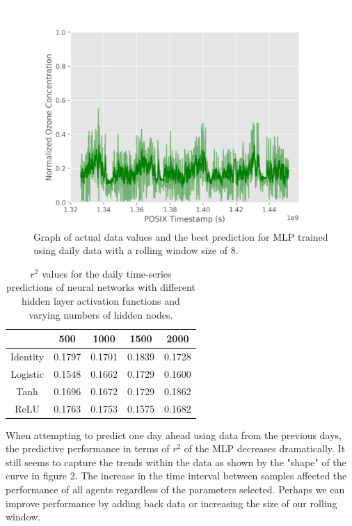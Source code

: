 \documentclass{article}
\begin{document}
\begin{figure}[H]
    \begin{center}
        \includegraphics[scale=0.75]{D8_2000_TANH.png}
    \end{center}
    \caption{Graph of actual data values and the best prediction for MLP trained using daily data with a rolling window size of 8.}
\end{figure}

\begin{table}[H]
    \centering
    \begin{tabular}{| c | c | c | c | c |}
        \hline
        \cellcolor{black} & \cellcolor{Gray} 500 & \cellcolor{Gray} 1000 & \cellcolor{Gray} 1500 & \cellcolor{Gray} 2000 \\
        \hline
        \cellcolor{Gray} Identity & 0.1797 & 0.1701 & 0.1839 & 0.1728 \\
        \hline
        \cellcolor{Gray} Logistic & 0.1548 & 0.1662 & 0.1729 & 0.1600 \\
        \hline
        \cellcolor{Gray} Tanh & 0.1696 & 0.1672 & 0.1729 & \cellcolor{green} 0.1862 \\
        \hline
        \cellcolor{Gray} ReLU & 0.1763 & 0.1753 & 0.1575 & 0.1682 \\
        \hline
    \end{tabular}
    \caption{$r^2$ values for the daily time-series predictions of neural networks with different hidden layer activation functions and varying numbers of hidden nodes.}
\end{table}

When attempting to predict one day ahead using data from the previous days, the predictive performance in terms of $r^2$ of the MLP decreases dramatically. It still seems to capture the trends within the data as shown by the "shape" of the curve in figure 2. The increase in the time interval between samples affected the performance of all agents regardless of the parameters selected. Perhaps we can improve performance by adding back data or increasing the size of our rolling window.
\end{document}
